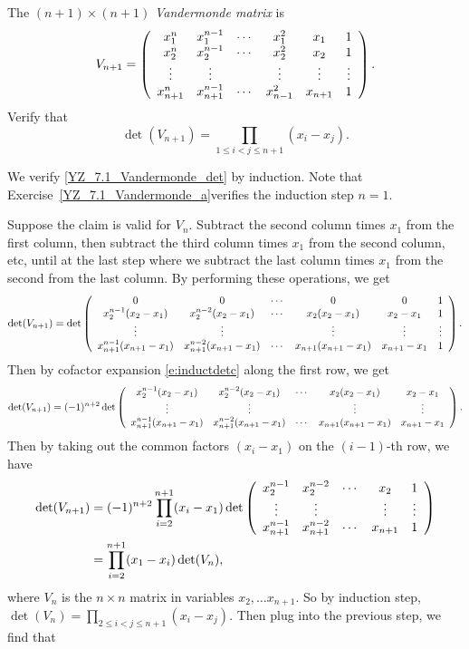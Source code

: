\documentclass{ximera}
\begin{document}
\begin{exercise}   \label{YZ_7.1_Vandermonde_c} 
The $(n+1)\times (n+1)$ {\em Vandermonde matrix} is
\begin{equation}  \label{YZ_7.1_Vandermonde}
V_{n+1} = \left(\begin{array}{cccccccccccc} x_1^n &x_1^{n-1}&\cdots&x_1^2&x_1&1\\
x_2^n &x_2^{n-1}&\cdots&x_2^2&x_2&1\\
\vdots&\vdots & & \vdots&\vdots &\vdots\\
x_{n+1}^n &x_{n+1}^{n-1}&\cdots&x^2_{n-1}&x_{n+1}&1\\ \end{array}\right).
\end{equation}
Verify that
\begin{equation}  \label{YZ_7.1_Vandermonde_det}
\det(V_{n+1})=\prod_{1\le i<j\le n+1}(x_i-x_j).
\end{equation}

\begin{solution}

\soln 

We verify \eqref{YZ_7.1_Vandermonde_det} by induction. Note that Exercise~\ref{YZ_7.1_Vandermonde_a}verifies the induction step $n = 1$.

Suppose the claim is valid for $V_n$. Subtract the second column times $x_1$ from the first column, then subtract the third column times $x_1$ from the second column, etc, until at the last step where we subtract the last column times $x_1$ from the second from the last column. By performing these operations, we get
\[
\det(V_{n+1})=
\det\left(\begin{array}{cccccccccccc} 0&0&\cdots &0&0&1\\
x_2^{n-1}(x_2-x_1) &x_2^{n-2}(x_2-x_1)&\cdots&x_2(x_2-x_1)&x_2-x_1&1\\
\vdots&\vdots & & \vdots &\vdots&\vdots\\
x_{n+1}^{n-1}(x_{n+1}-x_1) &x_{n+1}^{n-2}(x_{n+1}-x_1)&\cdots&x_{n+1}(x_{n+1}-x_1)&x_{n+1}-x_1&1 \end{array}\right).
\]
Then by cofactor expansion \eqref{e:inductdetc} along the first row, we get
\[
\det(V_{n+1})=(-1)^{n+2}\det\left(\begin{array}{cccccccccccc} 
x_2^{n-1}(x_2-x_1) &x_2^{n-2}(x_2-x_1)&\cdots&x_2(x_2-x_1)&x_2-x_1\\
\vdots&\vdots & & \vdots &\vdots\\
x_{n+1}^{n-1}(x_{n+1}-x_1) &x_{n+1}^{n-2}(x_{n+1}-x_1)&\cdots&x_{n+1}(x_{n+1}-x_1)&x_{n+1}-x_1 \end{array}\right).
\]
Then by taking out the common factors $(x_i-x_1)$ on the $(i-1)$-th row, we have
\begin{align*}
    \det(V_{n+1}) & =(-1)^{n+2}\prod_{i=2}^{n+1}(x_i-x_1)
    \det\left(\begin{array}{cccccccccccc}  x_2^{n-1} & x_2^{n-2} & \cdots&x_2&1\\ \vdots&\vdots & & \vdots &\vdots\\
x_{n+1}^{n-1} &x_{n+1}^{n-2}&\cdots&x_{n+1}&1 \end{array}\right)\\ &=\prod_{i=2}^{n+1}(x_1-x_i)\det(V_n),
\end{align*}
where $V_n$ is the $n\times n$ matrix in variables $x_2,\ldots x_{n+1}$. So by induction step, $\det(V_n)=\prod_{2\le i<j\le n+1}(x_i-x_j)$. Then plug into the previous step, we find that


\end{solution}
\end{exercise}
\end{document}
